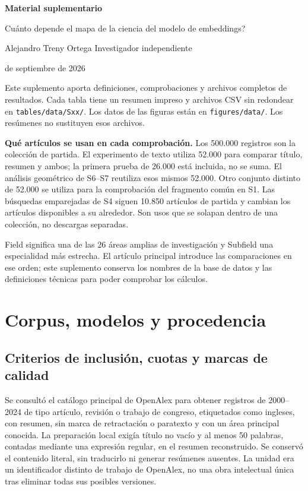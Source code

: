 \documentclass[12pt]{article}
\begin{document}
\begin{center}
{\LARGE\bfseries Material suplementario\par}
\medskip
{\large \textquestiondown{}Cuánto depende el mapa de la ciencia del modelo de embeddings?\par}
\medskip
Alejandro Treny Ortega \textbullet{} Investigador independiente\par
{} de septiembre de 2026
\end{center}

Este suplemento aporta definiciones, comprobaciones y archivos completos de resultados. Cada tabla tiene un resumen impreso y archivos CSV sin redondear en \nolinkurl{tables/data/Sxx/}. Los datos de las figuras están en \nolinkurl{figures/data/}. Los resúmenes no sustituyen esos archivos.

\textbf{Qué artículos se usan en cada comprobación.}
Los 500.000 registros son la colección de partida. El experimento de texto utiliza 52.000 para comparar título, resumen y ambos; la primera prueba de 26.000 está incluida, no se suma. El análisis geométrico de S6--S7 reutiliza esos mismos 52.000. Otro conjunto distinto de 52.000 se utiliza para la comprobación del fragmento común en S1. Las búsquedas emparejadas de S4 siguen 10.850 artículos de partida y cambian los artículos disponibles a su alrededor. Son usos que se solapan dentro de una colección, no descargas separadas.

Field significa una de las 26 áreas amplias de investigación y Subfield una especialidad más estrecha. El artículo principal introduce las comparaciones en ese orden; este suplemento conserva los nombres de la base de datos y las definiciones técnicas para poder comprobar los cálculos.

\medskip
{\small{}\setcounter{tocdepth}{1}\tableofcontents}
\clearpage

\section{Corpus, modelos y procedencia}
\subsection{Criterios de inclusión, cuotas y marcas de calidad}
Se consultó el catálogo principal de OpenAlex para obtener registros de 2000--2024 de tipo artículo, revisión o trabajo de congreso, etiquetados como ingleses, con resumen, sin marca de retractación o paratexto y con un área principal conocida. La preparación local exigía título no vacío y al menos 50 palabras, contadas mediante una expresión regular, en el resumen reconstruido. Se conservó el contenido literal, sin traducirlo ni generar resúmenes ausentes. La unidad era un identificador distinto de trabajo de OpenAlex, no una obra intelectual única tras eliminar todas sus posibles versiones.
\end{document}
